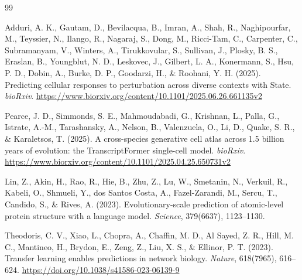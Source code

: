 \documentclass{article}
\begin{document}
\FloatBarrier

\begin{thebibliography}{99}

Adduri, A. K., Gautam, D., Bevilacqua, B., Imran, A., Shah, R., Naghipourfar, M., Teyssier, N., Ilango, R., Nagaraj, S., Dong, M., Ricci-Tam, C., Carpenter, C., Subramanyam, V., Winters, A., Tirukkovular, S., Sullivan, J., Plosky, B. S., Eraslan, B., Youngblut, N. D., Leskovec, J., Gilbert, L. A., Konermann, S., Hsu, P. D., Dobin, A., Burke, D. P., Goodarzi, H., \& Roohani, Y. H. (2025). Predicting cellular responses to perturbation across diverse contexts with State. \textit{bioRxiv}. \url{https://www.biorxiv.org/content/10.1101/2025.06.26.661135v2}

Pearce, J. D., Simmonds, S. E., Mahmoudabadi, G., Krishnan, L., Palla, G., Istrate, A.-M., Tarashansky, A., Nelson, B., Valenzuela, O., Li, D., Quake, S. R., \& Karaletsos, T. (2025). A cross-species generative cell atlas across 1.5 billion years of evolution: the TranscriptFormer single-cell model. \textit{bioRxiv}. \url{https://www.biorxiv.org/content/10.1101/2025.04.25.650731v2}

Lin, Z., Akin, H., Rao, R., Hie, B., Zhu, Z., Lu, W., Smetanin, N., Verkuil, R., Kabeli, O., Shmueli, Y., dos Santos Costa, A., Fazel-Zarandi, M., Sercu, T., Candido, S., \& Rives, A. (2023). Evolutionary-scale prediction of atomic-level protein structure with a language model. \textit{Science}, 379(6637), 1123--1130.

Theodoris, C. V., Xiao, L., Chopra, A., Chaffin, M. D., Al Sayed, Z. R., Hill, M. C., Mantineo, H., Brydon, E., Zeng, Z., Liu, X. S., \& Ellinor, P. T. (2023). Transfer learning enables predictions in network biology. \textit{Nature}, 618(7965), 616--624. \url{https://doi.org/10.1038/s41586-023-06139-9}

\end{thebibliography}
\end{document}
